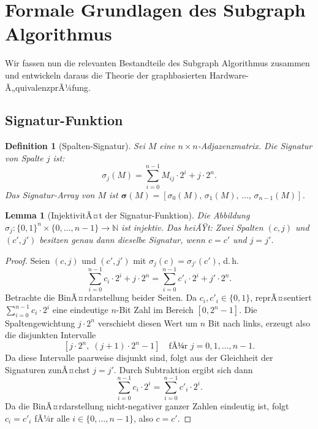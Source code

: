 ﻿\documentclass[12pt,a4paper]{report}
\newtheorem{definition}{Definition}[section]
\newtheorem{lemma}[theorem]{Lemma}
\begin{document}
\section{Formale Grundlagen des Subgraph Algorithmus}

Wir fassen nun die relevanten Bestandteile des Subgraph Algorithmus \cite{subgraph2026} zusammen und entwickeln daraus die Theorie der graphbasierten Hardware-Ã„quivalenzprÃ¼fung.

\subsection{Signatur-Funktion}

\begin{definition}[Spalten-Signatur]
\label{def:signatur}
Sei $M$ eine $n \times n$-Adjazenzmatrix. Die \emph{Signatur} von Spalte $j$ ist:
\[
\sigma_j(M) = \sum_{i=0}^{n-1} M_{ij} \cdot 2^i + j \cdot 2^n.
\]
Das \emph{Signatur-Array} von $M$ ist $\boldsymbol{\sigma}(M) = [\sigma_0(M),\, \sigma_1(M),\, \ldots,\, \sigma_{n-1}(M)]$.
\end{definition}

\begin{lemma}[InjektivitÃ¤t der Signatur-Funktion]
\label{lem:injektivitaet}
Die Abbildung $\sigma_j: \{0,1\}^n \times \{0,\ldots,n-1\} \to \mathbb{N}$ ist injektiv. Das heiÃŸt: Zwei Spalten $(c, j)$ und $(c', j')$ besitzen genau dann dieselbe Signatur, wenn $c = c'$ und $j = j'$.
\end{lemma}

\begin{proof}
Seien $(c, j)$ und $(c', j')$ mit $\sigma_j(c) = \sigma_{j'}(c')$, d.\,h.\
\[
\sum_{i=0}^{n-1} c_i \cdot 2^i + j \cdot 2^n = \sum_{i=0}^{n-1} c'_i \cdot 2^i + j' \cdot 2^n.
\]
Betrachte die BinÃ¤rdarstellung beider Seiten. Da $c_i, c'_i \in \{0,1\}$, reprÃ¤sentiert $\sum_{i=0}^{n-1} c_i \cdot 2^i$ eine eindeutige $n$-Bit Zahl im Bereich $[0, 2^n - 1]$. Die Spaltengewichtung $j \cdot 2^n$ verschiebt diesen Wert um $n$ Bit nach links, erzeugt also die disjunkten Intervalle
\[
[j \cdot 2^n,\; (j+1) \cdot 2^n - 1] \quad \text{fÃ¼r } j = 0, 1, \ldots, n-1.
\]
Da diese Intervalle paarweise disjunkt sind, folgt aus der Gleichheit der Signaturen zunÃ¤chst $j = j'$. Durch Subtraktion ergibt sich dann
\[
\sum_{i=0}^{n-1} c_i \cdot 2^i = \sum_{i=0}^{n-1} c'_i \cdot 2^i.
\]
Da die BinÃ¤rdarstellung nicht-negativer ganzer Zahlen eindeutig ist, folgt $c_i = c'_i$ fÃ¼r alle $i \in \{0,\ldots,n-1\}$, also $c = c'$.
\end{proof}
\end{document}
